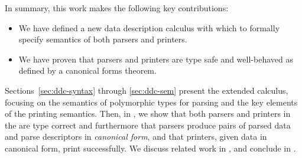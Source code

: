 In summary, this work makes the following key contributions:
\begin{itemize}
\item We have defined a new data description calculus with which to
  formally specify semantics of both \padsml{} parsers and printers.
\item We have proven that \ddc{} parsers and printers are type safe
  and well-behaved as defined by a canonical forms theorem.
\end{itemize}

Sections~\ref{sec:ddc-syntax} through \ref{sec:ddc-sem} present the
extended \ddc{} calculus, focusing on the semantics of polymorphic
types for parsing and the key elements of the printing semantics.
Then, in , we show that both parsers and
printers in the \ddc{} are type correct and furthermore that parsers
produce pairs of parsed data and parse descriptors in {\em canonical
  form}, and that printers, given data in canonical form, print
successfully. We discuss related work in , and
conclude in .

